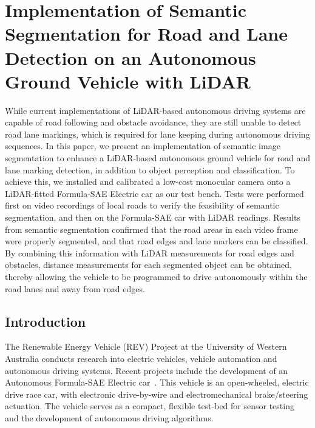 
\chapter[Semantic Segmentation for Road and Lane Detection]{Implementation of Semantic Segmentation for Road and Lane Detection on an Autonomous Ground Vehicle with LiDAR}
\label{ch:semseg}

\ifpdf
	\graphicspath{{Chapter5/Figs/Raster/}{Chapter5/Figs/PDF/}{Chapter5/Figs/}}
\else
	\graphicspath{{Chapter5/Figs/Vector/}{Chapter5/Figs/}}
\fi

While current implementations of LiDAR-based autonomous driving systems are capable of road following and obstacle avoidance, they are still unable to detect road lane markings, which is required for lane keeping during autonomous driving sequences. In this paper, we present an implementation of semantic image segmentation to enhance a LiDAR-based autonomous ground vehicle for road and lane marking detection, in addition to object perception and classification. To achieve this, we installed and calibrated a low-cost monocular camera onto a LiDAR-fitted Formula-SAE Electric car as our test bench. Tests were performed first on video recordings of local roads to verify the feasibility of semantic segmentation, and then on the Formula-SAE car with LiDAR readings. Results from semantic segmentation confirmed that the road areas in each video frame were properly segmented, and that road edges and lane markers can be classified. By combining this information with LiDAR measurements for road edges and obstacles, distance measurements for each segmented object can be obtained, thereby allowing the vehicle to be programmed to drive autonomously within the road lanes and away from road edges.

\section{Introduction}
The Renewable Energy Vehicle (REV) Project at the University of Western Australia conducts research into electric vehicles, vehicle automation and autonomous driving systems. Recent projects include the development of an Autonomous Formula-SAE Electric car~\cite{t._drage_integration_2014}. This vehicle is an open-wheeled, electric drive race car, with electronic drive-by-wire and electromechanical brake/steering actuation. The vehicle serves as a compact, flexible test-bed for sensor testing and the development of autonomous driving algorithms.

